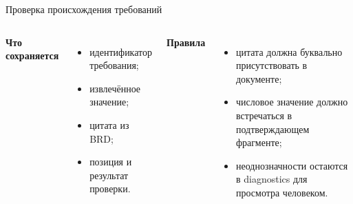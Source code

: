 \documentclass[aspectratio=169,10pt]{beamer}
\begin{document}
\begin{frame}{Проверка происхождения требований}
  \begin{columns}[T,onlytextwidth]
      \textbf{Что сохраняется}
      \begin{itemize}
        \item идентификатор требования;
        \item извлечённое значение;
        \item цитата из BRD;
        \item позиция и результат проверки.
      \end{itemize}
      \textbf{Правила}
      \begin{itemize}
        \item цитата должна буквально присутствовать в документе;
        \item числовое значение должно встречаться в подтверждающем фрагменте;
        \item неоднозначности остаются в diagnostics для просмотра человеком.
      \end{itemize}
  \end{columns}
  \vfill
\end{frame}
\end{document}
